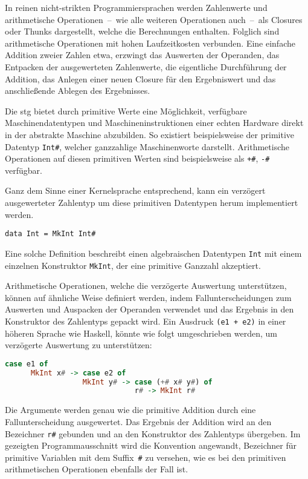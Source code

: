 In reinen nicht-strikten Programmiersprachen werden Zahlenwerte und arithmetische Operationen~--~wie alle weiteren Operationen auch~--~als Closures oder Thunks dargestellt, welche die Berechnungen enthalten.
Folglich sind arithmetische Operationen mit hohen Laufzeitkosten verbunden.
Eine einfache Addition zweier Zahlen etwa, erzwingt das Auswerten der Operanden, das Entpacken der ausgewerteten Zahlenwerte, die eigentliche Durchführung der Addition, das Anlegen einer neuen Closure für den Ergebniswert und das anschließende Ablegen des Ergebnisses.

Die \gls{stg} bietet durch primitive Werte eine Möglichkeit, verfügbare Maschinendatentypen und Maschineninstruktionen einer echten Hardware direkt in der abstrakte Maschine abzubilden.
So existiert beispielsweise der primitive Datentyp \texttt{Int\#}, welcher ganzzahlige Maschinenworte darstellt.
Arithmetische Operationen auf diesen primitiven Werten sind beispielsweise als \texttt{+\#}, \texttt{-\#} verfügbar.

Ganz dem Sinne einer Kernelsprache entsprechend, kann ein verzögert ausgewerteter Zahlentyp um diese primitiven Datentypen herum implementiert werden.

\begin{center}
  \texttt{data Int = MkInt Int\#}
\end{center}

Eine solche Definition beschreibt einen algebraischen Datentypen \texttt{Int} mit einem einzelnen Konstruktor \texttt{MkInt}, der eine primitive Ganzzahl akzeptiert.

Arithmetische Operationen, welche die verzögerte Auswertung unterstützen, können auf ähnliche Weise definiert werden, indem Fallunterscheidungen zum Auswerten und Auspacken der Operanden verwendet und das Ergebnis in den Konstruktor des Zahlentyps gepackt wird.
Ein Ausdruck \texttt{(e1 + e2)} in einer höheren Sprache wie Haskell, könnte wie folgt umgeschrieben werden, um verzögerte Auswertung zu unterstützen:

\begin{lstlisting}[language=haskell]
      case e1 of
      MkInt x# -> case e2 of
                  MkInt y# -> case (+# x# y#) of
                              r# -> MkInt r#
\end{lstlisting}

Die Argumente werden genau wie die primitive Addition durch eine Fallunterscheidung ausgewertet.
Das Ergebnis der Addition wird an den Bezeichner \texttt{r\#} gebunden und an den Konstruktor des Zahlentyps übergeben.
Im gezeigten Programmausschnitt wird die Konvention angewandt, Bezeichner für primitive Variablen mit dem Suffix~\texttt{\#} zu versehen, wie es bei den primitiven arithmetischen Operationen ebenfalls der Fall ist.

